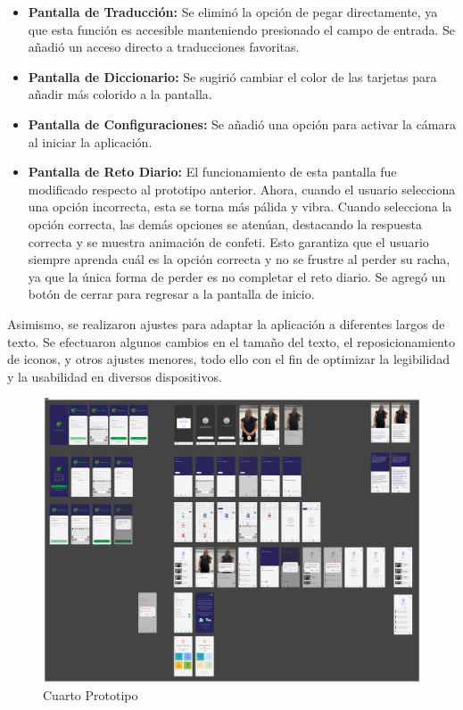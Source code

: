 \begin{itemize}
    \item \textbf{Pantalla de Traducción:} Se eliminó la opción de pegar directamente, ya que esta función es accesible manteniendo presionado el campo de entrada. Se añadió un acceso directo a traducciones favoritas.
    
    \item \textbf{Pantalla de Diccionario:} Se sugirió cambiar el color de las tarjetas para añadir más colorido a la pantalla.
    
    \item \textbf{Pantalla de Configuraciones:} Se añadió una opción para activar la cámara al iniciar la aplicación.
    
    \item \textbf{Pantalla de Reto Diario:} El funcionamiento de esta pantalla fue modificado respecto al prototipo anterior. Ahora, cuando el usuario selecciona una opción incorrecta, esta se torna más pálida y vibra. Cuando selecciona la opción correcta, las demás opciones se atenúan, destacando la respuesta correcta y se muestra animación de confeti. Esto garantiza que el usuario siempre aprenda cuál es la opción correcta y no se frustre al perder su racha, ya que la única forma de perder es no completar el reto diario. Se agregó un botón de cerrar para regresar a la pantalla de inicio.
\end{itemize}

Asimismo, se realizaron ajustes para adaptar la aplicación a diferentes largos de texto. Se efectuaron algunos cambios en el tamaño del texto, el reposicionamiento de iconos, y otros ajustes menores, todo ello con el fin de optimizar la legibilidad y la usabilidad en diversos dispositivos.


\begin{figure} [H]
    \centering
    \includegraphics[width=1\linewidth]{figuras/prototipo4.png}
    \caption{Cuarto Prototipo}
    \label{fig:enter-label}
\end{figure}

